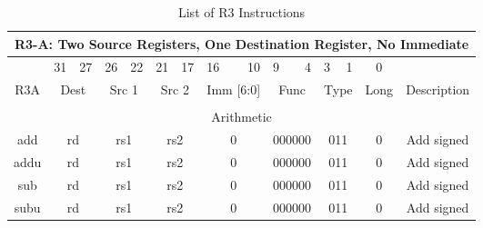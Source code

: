 \documentclass{article}
\begin{document}
    \begin{center}
    \begin{longtable}{|c|l|r|l|r|l|r|l|r|l|r|l|r|c|c|}
    \caption{List of R3 Instructions}
    \label{table:r3_instr} \\
    
                    \multicolumn{15}{c}{R3-A: Two Source Registers, One Destination Register, No Immediate} \\  
    \hline      &   \multicolumn{1}{l}{31}  &   27      &   \multicolumn{1}{l}{26}  &   22  &   \multicolumn{1}{l}{21}  &   17      &   \multicolumn{1}{l}{16}  &   10      &   \multicolumn{1}{l}{9}   &   4   &   \multicolumn{1}{l}{3}   &   1   &   0       & \\
    \hline R3A  &   \multicolumn{2}{|c|}{Dest}          &   \multicolumn{2}{|c|}{Src 1}     &   \multicolumn{2}{|c|}{Src 2}         &   \multicolumn{2}{|c|}{Imm [6:0]}     &   \multicolumn{2}{|c|}{Func}      &   \multicolumn{2}{|c|}{Type}      &   Long    &   Description \\
    
    
    \hline          \multicolumn{15}{|c|}{} \\
    
                    \multicolumn{15}{|c|}{Arithmetic} \\    
    \hline add  &   \multicolumn{2}{|c|}{rd}            &   \multicolumn{2}{|c|}{rs1}       &   \multicolumn{2}{|c|}{rs2}           &   \multicolumn{2}{|c|}{0}             &   \multicolumn{2}{|c|}{000000}    &   \multicolumn{2}{|c|}{011}       &   0       &   Add signed \\
    \hline addu &   \multicolumn{2}{|c|}{rd}            &   \multicolumn{2}{|c|}{rs1}       &   \multicolumn{2}{|c|}{rs2}           &   \multicolumn{2}{|c|}{0}             &   \multicolumn{2}{|c|}{000000}    &   \multicolumn{2}{|c|}{011}       &   0       &   Add signed \\
    \hline sub  &   \multicolumn{2}{|c|}{rd}            &   \multicolumn{2}{|c|}{rs1}       &   \multicolumn{2}{|c|}{rs2}           &   \multicolumn{2}{|c|}{0}             &   \multicolumn{2}{|c|}{000000}    &   \multicolumn{2}{|c|}{011}       &   0       &   Add signed \\
    \hline subu &   \multicolumn{2}{|c|}{rd}            &   \multicolumn{2}{|c|}{rs1}       &   \multicolumn{2}{|c|}{rs2}           &   \multicolumn{2}{|c|}{0}             &   \multicolumn{2}{|c|}{000000}    &   \multicolumn{2}{|c|}{011}       &   0       &   Add signed \\



\end{longtable}
\end{center}
\end{document}
